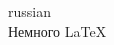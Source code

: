 \documentclass[preview]{standalone}
\begin{document}
\begin{center}
\begin{otherlanguage*}{russian} \\ Немного \LaTeX \\ \end{otherlanguage*}
\end{center}
\end{document}
